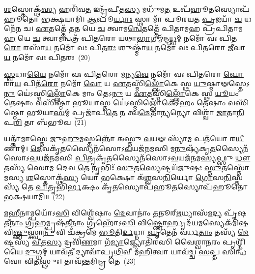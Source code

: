 \-\ul{𑌶}\-𑌸𑍍𑌤𑍋𑌕𑍍𑌥᳴\-\ul{𑌸𑍍𑌯} 𑌹𑌰𑌿᳴𑌵\-\ul{𑌤} 𑌇𑌨𑍍𑌦𑍍𑌰᳴𑌪𑍀𑌤\-\ul{𑌸𑍍𑌯} 𑌮𑌧𑍁᳴𑌮\-\ul{𑌤} 𑌉𑌪᳴𑌹𑍂\-\ul{𑌤}\-𑌸𑍍𑌯𑍋𑌪᳴𑌹𑍂𑌤𑍋 𑌭𑌕𑍍𑌷𑌯𑌾𑌮𑌿। \ul{𑌆}\-𑌪𑍂\-\ul{𑌰𑍍𑌯𑌾𑌃} 𑌸𑍍𑌥𑌾 𑌮𑌾᳴ 𑌪𑍂𑌰𑌯𑌤 \ul{𑌪𑍍𑌰}\-𑌜𑌯𑌾᳴ \ul{𑌚} 𑌧𑌨𑍇᳴𑌨 𑌚। \ul{𑌏}\-𑌤𑌤𑍍𑌤𑍇᳴ 𑌤\-\ul{𑌤} 𑌯𑍇 \ul{𑌚} 𑌤𑍍𑌵𑌾𑌮\-\ul{𑌨𑍍𑌵𑍇}\-𑌤𑌤𑍍𑌤𑍇᳴ 𑌪𑌿𑌤𑌾𑌮𑌹 𑌪𑍍𑌰𑌪𑌿𑌤𑌾𑌮\-\ul{𑌹} 𑌯𑍇 \ul{𑌚} 𑌤𑍍𑌵𑌾𑌮𑌨𑍍𑌵𑌤𑍍𑌰᳴ 𑌪𑌿𑌤𑌰𑍋 𑌯𑌥𑌾\-\ul{𑌭𑌾}\-𑌗𑌮𑍍𑌮᳴𑌨𑍍𑌦\-\ul{𑌧𑍍𑌵}\-𑌮𑍍 𑌨𑌮𑍋᳴ 𑌵𑌃 𑌪𑌿𑌤\-\ul{𑌰𑍋} 𑌰𑌸𑌾᳴\-\ul{𑌯} 𑌨𑌮𑍋᳴ 𑌵𑌃 𑌪𑌿𑌤\-\ul{𑌰𑌃} 𑌶𑍁𑌷𑍍𑌮𑌾᳴\-\ul{𑌯} 𑌨𑌮𑍋᳴ 𑌵𑌃 𑌪𑌿𑌤𑌰𑍋 \ul{𑌜𑍀}\-𑌵𑌾\-\ul{𑌯} 𑌨𑌮𑍋᳴ 𑌵𑌃 𑌪𑌿𑌤𑌰𑌃~(20)

\-\ul{𑌸𑍍𑌵}\-𑌧𑌾\-\ul{𑌯𑍈} 𑌨𑌮𑍋᳴ 𑌵𑌃 𑌪𑌿𑌤𑌰𑍋 \ul{𑌮}\-𑌨𑍍𑌯\-\ul{𑌵𑍇} 𑌨𑌮𑍋᳴ 𑌵𑌃 𑌪𑌿𑌤𑌰𑍋 \ul{𑌘𑍋}\-𑌰𑌾\-\ul{𑌯} 𑌪𑌿𑌤᳴\-\ul{𑌰𑍋} 𑌨𑌮𑍋᳴ \ul{𑌵𑍋} 𑌯 \ul{𑌏}\-𑌤𑌸𑍍𑌮𑌿᳴\-\ul{𑌲𑍍𑌲𑍋𑌁}\-𑌕𑍇 𑌸𑍍𑌥 \ul{𑌯𑍁}\-𑌷𑍍𑌮𑌾𑍟𑌸𑍍𑌤𑍇\-𑌽\-\ul{𑌨𑍁} 𑌯𑍇॑\-𑌽𑌸𑍍𑌮𑌿\-\ul{𑌲𑍍𑌲𑍋𑌁}\-𑌕𑍇 𑌮𑌾𑌂 𑌤𑍇\-𑌽\-\ul{𑌨𑍁} 𑌯 \ul{𑌏}\-𑌤𑌸𑍍𑌮𑌿᳴\-\ul{𑌲𑍍𑌲𑍋𑌁}\-𑌕𑍇 𑌸𑍍𑌥 \ul{𑌯𑍂}\-𑌯𑌂 𑌤𑍇\-\ul{𑌷𑌾𑌂} 𑌵𑌸𑌿᳴𑌷𑍍𑌠𑌾 𑌭𑍂𑌯𑌾\-\ul{𑌸𑍍𑌤} 𑌯𑍇॑\-𑌽𑌸𑍍𑌮𑌿\-\ul{𑌲𑍍𑌲𑍋𑌁}\-𑌕𑍇᳴\-𑌽𑌹𑌂 𑌤𑍇\-\ul{𑌷𑌾𑌂} 𑌵𑌸𑌿᳴𑌷𑍍𑌠𑍋 𑌭𑍂𑌯𑌾\-\ul{𑌸}\-𑌮𑍍 𑌪𑍍𑌰𑌜𑌾᳴𑌪\-\ul{𑌤𑍇} 𑌨 𑌤𑍍𑌵\-\ul{𑌦𑍇}\-𑌤𑌾\-\ul{𑌨𑍍𑌯}\-𑌨𑍍𑌯𑍋 𑌵𑌿𑌶𑍍𑌵𑌾᳴ \ul{𑌜𑌾}\-𑌤𑌾\-\ul{𑌨𑌿} 𑌪\-\ul{𑌰𑌿} 𑌤𑌾 𑌬᳴𑌭𑍂𑌵~(21)

𑌯𑌤𑍍𑌕𑌾᳴𑌮𑌾𑌸𑍍𑌤𑍇 𑌜𑍁\-\ul{𑌹𑍁}\-𑌮𑌸𑍍𑌤𑌨𑍍𑌨𑍋᳴ 𑌅𑌸𑍍𑌤𑍁 \ul{𑌵}\-𑌯𑍟 𑌸𑍍𑌯𑌾᳴\-\ul{𑌮} 𑌪𑌤᳴𑌯𑍋 𑌰\-\ul{𑌯𑍀}\-𑌣𑌾𑌮𑍍। \ul{𑌦𑍇}\-𑌵𑌕𑍃᳴\-\ul{𑌤}\-𑌸𑍍𑌯𑍈𑌨᳴𑌸𑍋\-𑌽\-\ul{𑌵}\-𑌯𑌜᳴𑌨𑌮𑌸𑌿 𑌮\-\ul{𑌨𑍁}\-𑌷𑍍𑌯᳴𑌕𑍃\-\ul{𑌤}\-𑌸𑍍𑌯𑍈𑌨᳴𑌸𑍋\-𑌽\-\-\ul{𑌵}\-𑌯𑌜᳴𑌨𑌮𑌸𑌿 \ul{𑌪𑌿}\-𑌤𑍃𑌕𑍃᳴\-\ul{𑌤}\-𑌸𑍍𑌯𑍈𑌨᳴𑌸𑍋\-𑌽\-\ul{𑌵}\-𑌯𑌜᳴𑌨𑌮\-\ul{𑌸𑍍𑌯}\-𑌫𑍍𑌸𑍁 \ul{𑌧𑍗}\-𑌤𑌸𑍍𑌯᳴ 𑌸𑍋𑌮 𑌦𑍇𑌵 \ul{𑌤𑍇} 𑌨𑍃𑌭𑌿𑌃᳴ \ul{𑌸𑍁}\-𑌤\-\ul{𑌸𑍍𑌯𑍇}\-𑌷𑍍𑌟𑌯᳴𑌜𑍁𑌷𑌃 \ul{𑌸𑍍𑌤𑍁}\-𑌤𑌸𑍍𑌤𑍋᳴𑌮𑌸𑍍𑌯 \ul{𑌶}\-𑌸𑍍𑌤𑍋𑌕𑍍𑌥᳴\-\ul{𑌸𑍍𑌯} 𑌯𑍋 \ul{𑌭}\-𑌕𑍍𑌷𑍋 𑌅᳴\-\ul{𑌶𑍍𑌵}\-𑌸\-\ul{𑌨𑌿}\-𑌰𑍍𑌯𑍋 \ul{𑌗𑍋}\-𑌸\-\ul{𑌨𑌿}\-𑌸𑍍𑌤𑌸𑍍𑌯᳴ 𑌤𑍇 \ul{𑌪𑌿}\-𑌤𑍃𑌭𑌿᳴\-\ul{𑌰𑍍𑌭}\-𑌕𑍍𑌷𑌂 𑌕𑍃᳴\-\ul{𑌤}\-𑌸𑍍𑌯𑍋𑌪᳴𑌹𑍂\-\ul{𑌤}\-𑌸𑍍𑌯𑍋𑌪᳴𑌹𑍂𑌤𑍋 𑌭𑌕𑍍𑌷𑌯𑌾𑌮𑌿॥~(22)

{}%

\-\ul{𑌮}\-\-\ul{𑌹𑍀}\-𑌨𑌾𑌮𑍍𑌪𑌯𑍋᳴\-𑌽\-\ul{𑌸𑌿} 𑌵𑌿𑌶𑍍𑌵𑍇᳴𑌷𑌾𑌂 \ul{𑌦𑍇}\-𑌵𑌾𑌨𑌾𑌂॑ \ul{𑌤}\-𑌨𑍂𑌰𑍍\mbox{}\-\ul{𑌋}\-𑌧𑍍𑌯𑌾𑌸᳴\-\ul{𑌮}\-𑌦𑍍𑌯 𑌪𑍃᳴𑌷𑌤𑍀\-\ul{𑌨𑌾𑌂} 𑌗𑍍𑌰\-\ul{𑌹}\-𑌮𑍍𑌪𑍃𑌷᳴𑌤𑍀\-\ul{𑌨𑌾𑌂} 𑌗𑍍𑌰𑌹𑍋᳴\-𑌽\-\ul{𑌸𑌿} 𑌵𑌿\-\ul{𑌷𑍍𑌣𑍋}\-𑌰𑍍\mbox{}𑌹𑍃𑌦᳴𑌯\-\ul{𑌮}\-𑌸𑍍𑌯𑍇𑌕᳴𑌮𑌿\-\ul{𑌷} 𑌵𑌿\-\ul{𑌷𑍍𑌣𑍁}\-𑌸𑍍𑌤𑍍𑌵𑌾\-\ul{𑌨𑍁} 𑌵𑌿 𑌚᳴𑌕𑍍𑌰𑌮𑍇 \ul{𑌭𑍂}\-𑌤𑌿\-\ul{𑌰𑍍𑌦}\-𑌧𑍍𑌨𑌾 \ul{𑌘𑍃}\-𑌤𑍇𑌨᳴ 𑌵𑌰𑍍𑌧\-\ul{𑌤𑌾𑌂} 𑌤𑌸𑍍𑌯᳴ \ul{𑌮𑍇}\-𑌷𑍍𑌟𑌸𑍍𑌯᳴ \ul{𑌵𑍀}\-𑌤\-\ul{𑌸𑍍𑌯} 𑌦𑍍𑌰𑌵𑌿᳴\-\ul{𑌣}\-𑌮𑌾 𑌗᳴\-\ul{𑌮𑍍𑌯𑌾}\-𑌜𑍍𑌜𑍍𑌯𑍋𑌤𑌿᳴𑌰𑌸𑌿 𑌵𑍈𑌶𑍍𑌵𑌾\-\ul{𑌨}\-𑌰𑌂 𑌪𑍃𑌶𑍍𑌨𑌿᳴𑌯𑍈 \ul{𑌦𑍁}\-𑌗𑍍𑌧𑌮𑍍 𑌯𑌾𑌵᳴\-\ul{𑌤𑍀} 𑌦𑍍𑌯𑌾𑌵𑌾᳴𑌪𑍃\-\ul{𑌥𑌿}\-𑌵𑍀 𑌮᳴\-\ul{𑌹𑌿}\-𑌤𑍍𑌵𑌾 𑌯𑌾𑌵᳴𑌚𑍍𑌚 \ul{𑌸}\-𑌪𑍍𑌤 𑌸𑌿𑌨𑍍𑌧᳴𑌵𑍋 𑌵𑌿\-\ul{𑌤}\-𑌸𑍍𑌥𑍁𑌃। 𑌤𑌾𑌵᳴𑌨𑍍𑌤𑌮𑌿𑌨𑍍𑌦𑍍𑌰 𑌤𑍇~(23)

